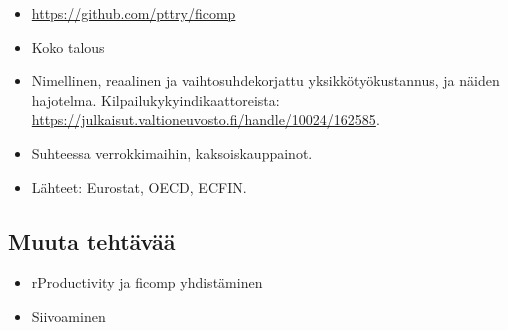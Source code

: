 \documentclass[
  letterpaper,
  DIV=11,
  numbers=noendperiod]{scrartcl}
\begin{document}
\begin{itemize}
\item
  \url{https://github.com/pttry/ficomp}
\item
  Koko talous
\item
  Nimellinen, reaalinen ja vaihtosuhdekorjattu yksikkötyökustannus, ja
  näiden hajotelma. Kilpailukykyindikaattoreista:
  \url{https://julkaisut.valtioneuvosto.fi/handle/10024/162585}.
\item
  Suhteessa verrokkimaihin, kaksoiskauppainot.
\item
  Lähteet: Eurostat, OECD, ECFIN.
\end{itemize}

\subsection{Muuta tehtävää}\label{muuta-tehtuxe4vuxe4uxe4}

\begin{itemize}
\item
  rProductivity ja ficomp yhdistäminen
\item
  Siivoaminen
\end{itemize}
\end{document}
